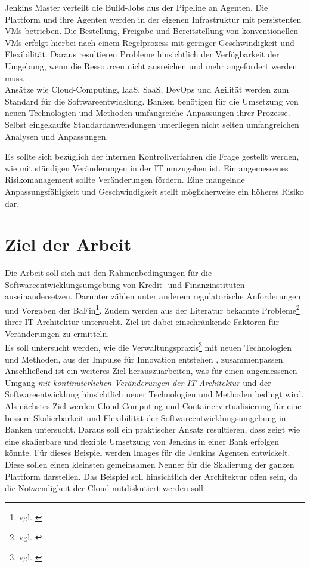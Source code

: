 Jenkins Master verteilt die Build-Jobs aus der Pipeline an Agenten. Die Plattform und ihre Agenten werden in der eigenen Infrastruktur mit persistenten \ac{VMs} betrieben. Die Bestellung, Freigabe und Bereitstellung von konventionellen \ac{VMs} erfolgt hierbei nach einem Regelprozess\cite{MaRisk:2017} mit geringer Geschwindigkeit und Flexibilität. Daraus resultieren Probleme hinsichtlich der Verfügbarkeit der Umgebung, wenn die Ressourcen nicht ausreichen und mehr angefordert werden muss.
\medskip
\\
Ansätze wie Cloud-Computing, \ac{IaaS}, \ac{SaaS}, DevOps und Agilität werden zum Standard für die Softwareentwicklung. Banken benötigen für die Umsetzung von neuen Technologien und Methoden umfangreiche Anpassungen ihrer Prozesse. Selbst eingekaufte Standardanwendungen unterliegen nicht selten umfangreichen Analysen und Anpassungen. 

Es sollte sich bezüglich der internen Kontrollverfahren die Frage gestellt werden, wie mit ständigen Veränderungen in der IT umzugehen ist. Ein angemessenes Risikomanagement sollte Veränderungen fördern. Eine mangelnde Anpassungsfähigkeit und Geschwindigkeit stellt möglicherweise ein höheres Risiko dar.
%
%
\section{Ziel der Arbeit}
\label{sec:intro:goal}
Die Arbeit soll sich mit den Rahmenbedingungen für die Softwareentwicklungsumgebung von Kredit- und Finanzinstituten auseinandersetzen. Darunter zählen unter anderem regulatorische Anforderungen und Vorgaben der \ac{BaFin}\footnote{vgl. \cite{MaRisk:2017, BAIT:2018}}. Zudem werden aus der Literatur bekannte Probleme\footnote{vgl. \cite{Brockhoff2006, Bussmann2006}} ihrer IT-Architektur untersucht. Ziel ist dabei einschränkende Faktoren für Veränderungen zu ermitteln.
\medskip
\\
Es soll untersucht werden, wie die Verwaltungspraxis\footnote{vgl. \cite{BaFin:Verwaltungspraxis}} mit neuen Technologien und Methoden, aus der Impulse für Innovation entstehen \cite{Bussmann2006}, zusammenpassen.
\medskip
\\
Anschließend ist ein weiteres Ziel herauszuarbeiten, was für einen angemessenen Umgang \emph{mit kontinuierlichen Veränderungen der IT-Architektur \cite{Bussmann2006}} und der Softwareentwicklung hinsichtlich neuer Technologien und Methoden bedingt wird.
\medskip
\\
Als nächstes Ziel werden Cloud-Computing und Containervirtualisierung für eine bessere Skalierbarkeit und Flexibilität der Softwareentwicklungsumgebung in Banken untersucht. Daraus soll ein praktischer Ansatz resultieren, dass zeigt wie eine skalierbare und flexible Umsetzung von Jenkins in einer Bank erfolgen könnte. Für dieses Beispiel werden Images für die Jenkins Agenten entwickelt. Diese sollen einen kleinsten gemeinsamen Nenner für die Skalierung der ganzen Plattform darstellen. Das Beispiel soll hinsichtlich der Architektur offen sein, da die Notwendigkeit der Cloud mitdiskutiert werden soll. 
%
%
